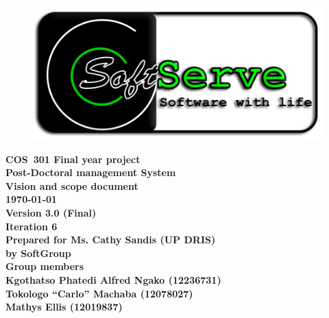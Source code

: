 \documentclass[12pt]{article}
\newcommand{\Title}{Vision and scope document} %
\newcommand{\Class}{COS\ 301 Final year project} %
\newcommand{\ssr}{Soft\color{green}{Serve }\color{black}}
\newcommand{\version}{3.0 (Final)}
\newcommand{\iteration}{6}
\newcommand{\client}{Ms. Cathy Sandis (UP DRIS)}
\newcommand{\project}{Post-Doctoral management System}
\begin{document}
\vspace{4em}

\begin{center}%

\begin{figure}[ht!]
\centering
\includegraphics{../Images_Docs/logo.png}
\end{figure}
\LARGE \bf \Class \\[0.25em]
\LARGE \bf \project \\[1em]
\LARGE \bf \Title \\[0.25em]
\large \bf \today\\
\bf Version \version\\
\bf Iteration \iteration\\[0.5em]
\Large \bf Prepared for \client\\
\Large \bf by
\Large {\bf \ssr Group }\\[0.5em]
\LARGE {\bf Group members}\\[0.25em]
\large
Kgothatso Phatedi Alfred Ngako (12236731) \\[0.5em]
Tokologo “Carlo” Machaba (12078027) \\[0.5em]
Mathys Ellis (12019837) \\[8em]

\end{center}%

\end{document}
